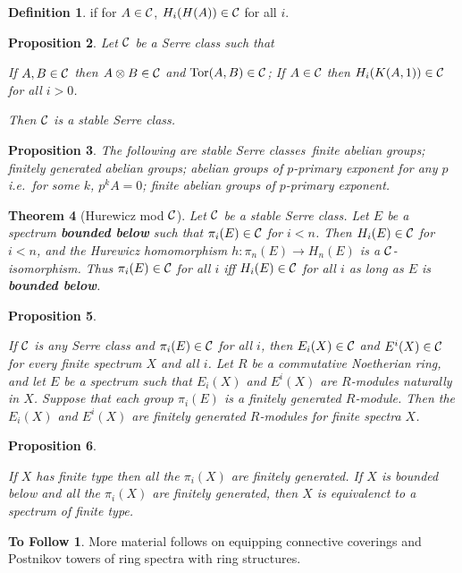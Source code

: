 \documentclass[11pt]{article}
\theoremstyle{plain}
\newtheorem{thm}{Theorem}[subsection]
\newtheorem{prop}[thm]{Proposition}
\theoremstyle{definition}
\newtheorem{defn}[thm]{Definition}
\newtheorem*{ToFollow}{To Follow}
\begin{document}
{\begin{defn}
if for $A\in\mathcal{C}$, $H_i(H(A))\in\mathcal{C}$ for all $i$.
\end{defn}
\begin{prop}
Let $\mathcal{C}$ be a Serre class such that
\begin{itemise}
\itm[(i)]If $A,B\in\mathcal{C}$ then $A\otimes B\in\mathcal{C}$ and $\operatorname{Tor}(A,B)\in\mathcal{C}$;
\itm[(ii)]If $A\in\mathcal{C}$ then $H_i(K(A,1))\in\mathcal{C}$ for all $i>0$.
\end{itemise}
Then $\mathcal{C}$ is a stable Serre class.
\end{prop}
\begin{prop}
The following are stable Serre classes\upcol\ finite abelian groups; finitely
generated abelian groups; abelian groups of $p$-primary exponent for any $p$
\lparen i.e.\ for some $k$, $p^kA=0$\rparen; finite abelian groups of
$p$-primary exponent.
\end{prop}
\begin{thm}[Hurewicz mod $\mathcal{C}$]
Let $\mathcal{C}$ be a stable Serre class. Let $E$
be a spectrum \textbf{bounded below} such that $\pi_i(E)\in\mathcal{C}$ for $i<n$.
Then $H_i(E)\in\mathcal{C}$ for $i<n$, and the Hurewicz homomorphism $h:\pi_n(E)\to
H_n(E)$ is a $\mathcal{C}$-isomorphism. Thus $\pi_i(E)\in \mathcal{C}$ for all $i$ iff
$H_i(E)\in \mathcal{C}$ for all $i$ as long as $E$ is \textbf{bounded below}.
\end{thm}
\begin{prop}\hfil
\begin{itemise}
\itm[(i)]If $\mathcal{C}$ is any Serre class and $\pi_i(E)\in\mathcal{C}$ for all $i$, then
$E_i(X)\in\mathcal{C}$ and $E^i(X)\in\mathcal{C}$ for every finite spectrum $X$ and all $i$.
\itm[(iii)]Let $R$ be a commutative Noetherian ring, and let $E$ be a spectrum
such that $E_i(X)$ and $E^i(X)$ are $R$-modules naturally in $X$. Suppose that
each group $\pi_i(E)$ is a finitely generated $R$-module. Then the $E_i(X)$ and
$E^i(X)$ are finitely generated $R$-modules for finite spectra $X$.
\end{itemise}
\end{prop}
\begin{prop}\hfil
\begin{itemise}
\itm[(i)]If $X$ has finite type then all the $\pi_i(X)$ are finitely generated.
\itm[(ii)]If $X$ is bounded below and all the $\pi_i(X)$ are finitely generated,
then $X$ is equivalenct to a spectrum of finite type.
\end{itemise}
\end{prop}
\begin{ToFollow}
More material follows on equipping connective coverings and Postnikov towers of
ring spectra with ring structures.
\end{ToFollow}
}   %
\end{document}
